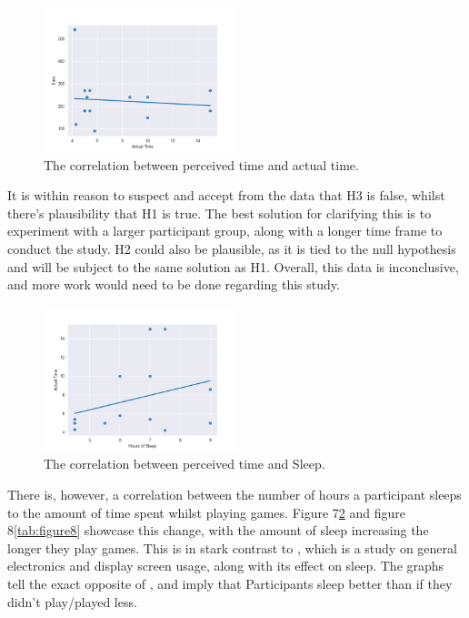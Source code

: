 \documentclass[conference]{IEEEtran}
\begin{document}
\begin{figure}[H]
\includegraphics[width = 0.5\textwidth]{Graph1}
\caption{The correlation between perceived time and actual time.}
\label{tab:figure6}
\end{figure}

It is within reason to suspect and accept from the data that H3 is false, whilst there's plausibility that H1 is true. The best solution for clarifying this is to experiment with a larger participant group, along with a longer time frame to conduct the study. H2 could also be plausible, as it is tied to the null hypothesis and will be subject to the same solution as H1. Overall, this data is inconclusive, and more work would need to be done regarding this study.

\begin{figure}[H]
\includegraphics[width = 0.5\textwidth]{Graph2}
\caption{The correlation between perceived time and Sleep.}
\label{tab:figure7}
\end{figure}

There is, however, a correlation between the number of hours a participant sleeps to the amount of time spent whilst playing games. Figure 7\ref{tab:figure7} and figure 8\ref{tab:figure8} showcase this change, with the amount of sleep increasing the longer they play games. This is in stark contrast to \cite{Yamazaki2022}, which is a study on general electronics and display screen usage, along with its effect on sleep. The graphs tell the exact opposite of \cite{Yamazaki2022}, and imply that Participants sleep better than if they didn't play/played less.
\end{document}
